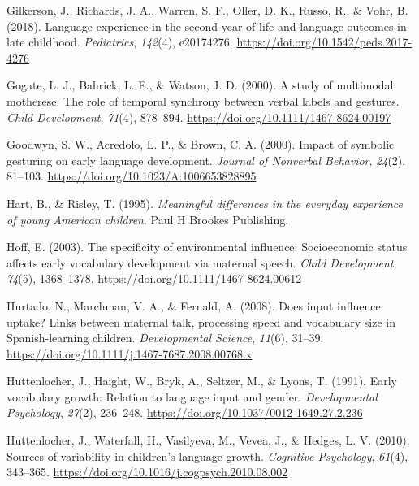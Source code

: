 \documentclass[
  man,mask,floatsintext]{apa6}
\newlength{\cslhangindent}
\newlength{\cslentryspacingunit} %
\newenvironment{CSLReferences}[2] %
 {%
  \setlength{\parindent}{0pt}
  \ifodd #1
  \let\oldpar\par
  \def\par{\hangindent=\cslhangindent\oldpar}
  \fi
  \setlength{\parskip}{#2\cslentryspacingunit}
 }%
 {}
\begin{document}
\begin{CSLReferences}{1}{0}
\leavevmode{}%
Gilkerson, J., Richards, J. A., Warren, S. F., Oller, D. K., Russo, R., \& Vohr, B. (2018). Language experience in the second year of life and language outcomes in late childhood. \emph{Pediatrics}, \emph{142}(4), e20174276. \url{https://doi.org/10.1542/peds.2017-4276}

\leavevmode{}%
Gogate, L. J., Bahrick, L. E., \& Watson, J. D. (2000). A study of multimodal motherese: {The} role of temporal synchrony between verbal labels and gestures. \emph{Child Development}, \emph{71}(4), 878--894. \url{https://doi.org/10.1111/1467-8624.00197}

\leavevmode{}%
Goodwyn, S. W., Acredolo, L. P., \& Brown, C. A. (2000). Impact of symbolic gesturing on early language development. \emph{Journal of Nonverbal Behavior}, \emph{24}(2), 81--103. \url{https://doi.org/10.1023/A:1006653828895}

\leavevmode{}%
Hart, B., \& Risley, T. (1995). \emph{Meaningful differences in the everyday experience of young {American} children}. Paul H Brookes Publishing.

\leavevmode{}%
Hoff, E. (2003). The specificity of environmental influence: {Socioeconomic} status affects early vocabulary development via maternal speech. \emph{Child Development}, \emph{74}(5), 1368--1378. \url{https://doi.org/10.1111/1467-8624.00612}

\leavevmode{}%
Hurtado, N., Marchman, V. A., \& Fernald, A. (2008). Does input influence uptake? {Links} between maternal talk, processing speed and vocabulary size in {Spanish}-learning children. \emph{Developmental Science}, \emph{11}(6), 31--39. \url{https://doi.org/10.1111/j.1467-7687.2008.00768.x}

\leavevmode{}%
Huttenlocher, J., Haight, W., Bryk, A., Seltzer, M., \& Lyons, T. (1991). Early vocabulary growth: {Relation} to language input and gender. \emph{Developmental Psychology}, \emph{27}(2), 236--248. \url{https://doi.org/10.1037/0012-1649.27.2.236}

\leavevmode{}%
Huttenlocher, J., Waterfall, H., Vasilyeva, M., Vevea, J., \& Hedges, L. V. (2010). Sources of variability in children's language growth. \emph{Cognitive Psychology}, \emph{61}(4), 343--365. \url{https://doi.org/10.1016/j.cogpsych.2010.08.002}


\end{CSLReferences}
\end{document}
